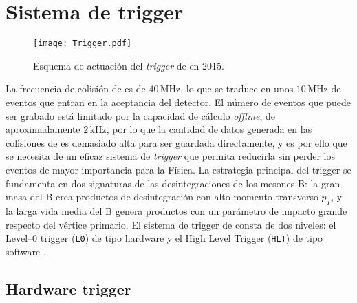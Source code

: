 \section{Sistema de trigger} %

\begin{wrapfigure}{r}{0.45\textwidth}
  \centering
  \texttt{[image: Trigger.pdf]}
  \caption{Esquema de actuación del \emph{trigger} de \lhcb en 2015.}	
\end{wrapfigure}

La frecuencia de colisión de \lhcb es de $40 \, \mathrm{M Hz}$, lo que se traduce en unos $10 \, \mathrm{M Hz}$ de eventos que entran en la aceptancia del detector. El número de \color{vero} eventos \color{norm} que puede ser grabado está limitado por la capacidad de cálculo \emph{offline}, de aproximadamente $2 \, \mathrm{k Hz}$, por lo que la cantidad de datos generada en  las colisiones de \lhc es demasiado alta para ser guardada directamente, y es por ello que se necesita de un eficaz sistema de \emph{trigger} que permita reducirla sin perder los eventos de mayor importancia para la Física. \color{new}
La estrategia principal del trigger se fundamenta en dos signaturas de las desintegraciones de los mesones B: la gran masa del B crea productos de desintegración con alto momento transverso $p_T$, y la larga vida media del B  genera productos con un parámetro de impacto grande respecto del vértice primario. \color{norm}
El sistema de trigger de \lhcb consta de dos niveles: \color{new} el Level--0 trigger (\texttt{L0}) de tipo hardware y el High Level Trigger (\texttt{HLT}) de tipo software \cite{Head_2014}. \color{norm}


\subsection{Hardware trigger} %
\label{sec_l0trigger}

